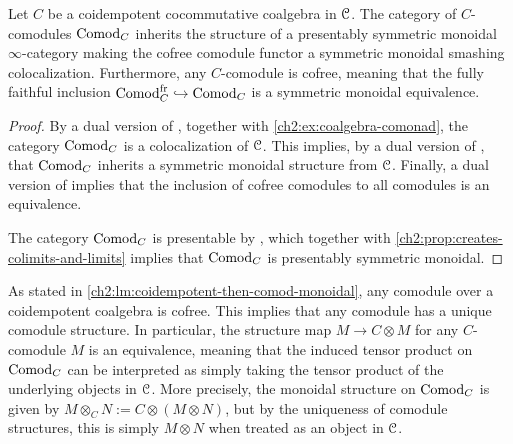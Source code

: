 \begin{lemma}
    \label{ch2:lm:coidempotent-then-comod-monoidal}
    Let $C$ be a coidempotent cocommutative coalgebra in $\EuScript{C}$. The category of $C$-comodules $\mathrm{Comod}_C$ inherits the structure of a presentably symmetric monoidal $\infty$-category making the cofree comodule functor a symmetric monoidal smashing colocalization. Furthermore, any $C$-comodule is cofree, meaning that the fully faithful inclusion $\mathrm{Comod}_C^{\mathrm{fr}} \hookrightarrow \mathrm{Comod}_C$ is a symmetric monoidal equivalence. 
\end{lemma}
\begin{proof}
    By a dual version of \cite[4.8.2.4]{Lurie_HA}, together with \cref{ch2:ex:coalgebra-comonad}, the category $\mathrm{Comod}_C$ is a colocalization of $\EuScript{C}$. This implies, by a dual version of \cite[4.8.2.7]{Lurie_HA}, that $\mathrm{Comod}_C$ inherits a symmetric monoidal structure from $\EuScript{C}$. Finally, a dual version of \cite[4.8.2.10]{Lurie_HA} implies that the inclusion of cofree comodules to all comodules is an equivalence. 

    The category $\mathrm{Comod}_C$ is presentable by \cite[2.1.11]{peroux_2020}, which together with \cref{ch2:prop:creates-colimits-and-limits} implies that $\mathrm{Comod}_C$ is presentably symmetric monoidal. 
\end{proof}

\begin{remark}
    \label{ch2:rm:unique-structure}
    As stated in \cref{ch2:lm:coidempotent-then-comod-monoidal}, any comodule over a coidempotent coalgebra is cofree. This implies that any comodule has a unique comodule structure. In particular, the structure map $M \to C\otimes M$ for any $C$-comodule $M$ is an equivalence, meaning that the induced tensor product on $\mathrm{Comod}_C$ can be interpreted as simply taking the tensor product of the underlying objects in $\EuScript{C}$. More precisely, the monoidal structure on $\mathrm{Comod}_C$ is given by $M\otimes_C N := C\otimes (M\otimes N)$, but by the uniqueness of comodule structures, this is simply $M\otimes N$ when treated as an object in $\EuScript{C}$. 
\end{remark}

